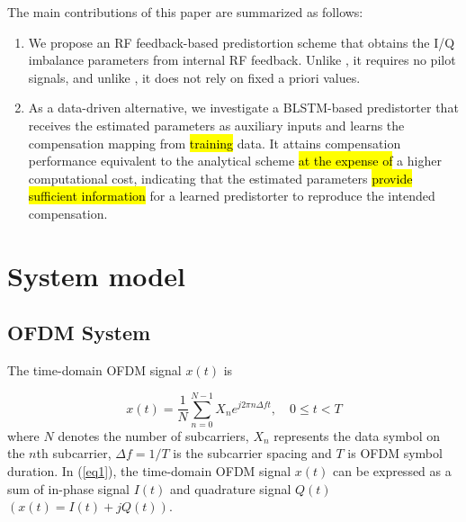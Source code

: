 \documentclass[lettersize,journal]{IEEEtran}
\begin{document}
The main contributions of this paper are summarized as follows:

\begin{enumerate}
    \item We propose an RF feedback-based predistortion scheme that obtains the I/Q imbalance parameters from internal RF feedback.
    Unlike \cite{REF7, REF8, REF9}, it requires no pilot signals, and unlike \cite{Mirror_Image}, it does not rely on fixed a priori values.
    
    \item As a data-driven alternative, we investigate a BLSTM-based predistorter that receives the estimated parameters as auxiliary inputs and learns the compensation mapping from 
    \hl{training} data.
    It attains compensation performance equivalent to the analytical scheme \hl{at the expense of} a higher computational cost, indicating that the estimated parameters \hl{provide sufficient information} for a learned predistorter to reproduce the intended compensation.
\end{enumerate}


\section{System model} \label{sec:system_model}

\subsection{OFDM System}
The time-domain OFDM signal $x(t)$ is \cite{Prasad}

\begin{equation}
\label{eq1}
x(t) = \frac{1}{N}\sum_{n=0}^{N-1} X_{n} e^{j2\pi n\Delta ft}, \quad 0 \leq t < T
\end{equation}
where $N$ denotes the number of subcarriers, $X_n$ represents the data symbol on the $n$th subcarrier, $\Delta f =1/T$ is the subcarrier spacing and $T$ is OFDM symbol duration.
In (\ref{eq1}), the time-domain OFDM signal $x(t)$ can be expressed as a sum of in-phase signal $I(t)$ and quadrature signal $Q(t)$ $(x(t) = I(t) + jQ(t))$.
\end{document}
